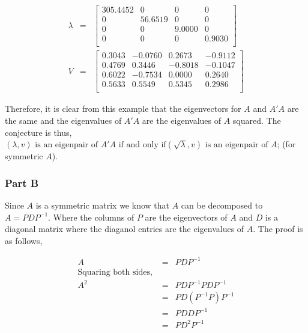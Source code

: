 \begin{eqnarray}
  \lambda &=&
  \begin{bmatrix}
  305.4452 &        0 &        0 &        0 \\
         0 &  56.6519 &        0 &        0 \\
         0 &        0 &   9.0000 &        0 \\
         0 &        0 &        0 &   0.9030 \\
  \end{bmatrix}
  \\
  V &=&
  \begin{bmatrix}
    0.3043 &  -0.0760 &   0.2673 &  -0.9112 \\
    0.4769 &   0.3446 &  -0.8018 &  -0.1047 \\
    0.6022 &  -0.7534 &   0.0000 &   0.2640 \\
    0.5633 &   0.5549 &   0.5345 &   0.2986 \\
  \end{bmatrix}
\end{eqnarray}

Therefore, it is clear from this example that the eigenvectors for \(A\) and \(A'A\) are the same and the eigenvalues of \(A'A\) are the eigenvalues of \(A\) squared.
The conjecture is thus, \((\lambda,v) \text{ is an eigenpair of } A'A \text{ if and only if} (\sqrt{\lambda},v) \text{ is an eigenpair of } A\); (for symmetric \(A\)).



\subsubsection{Part B}

Since \(A\) is a symmetric matrix we know that \(A\) can be decomposed to \(A = PDP^{-1}\). Where the columns of \(P\) are the eigenvectors of \(A\) and \(D\) is a diagonal matrix where the diaganol entries are the eigenvalues of \(A\).
The proof is as follows,

\begin{eqnarray}
  A &=& PDP^{-1} \\
  \text{Squaring both sides, } \\
  A^{2} &=& PDP^{-1}PDP^{-1} \\
  &=& PD(P^{-1}P)P^{-1} \\
  &=& PDDP^{-1} \\
  &=& PD^{2}P^{-1}
\end{eqnarray}

